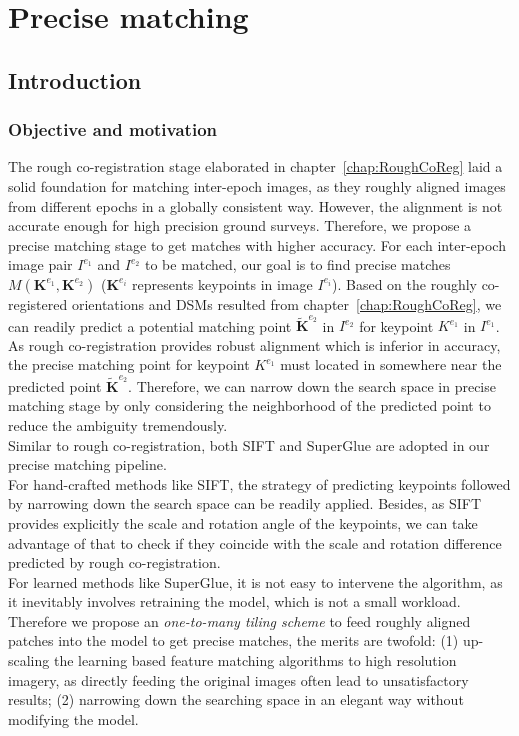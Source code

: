 
\chapter{Precise matching}
\label{chap:Precisematching}
\minitoc

\section{Introduction}
\subsection{Objective and motivation}
The rough co-registration stage elaborated in chapter~\ref{chap:RoughCoReg} laid a solid foundation for matching inter-epoch images, as they roughly aligned images from different epochs in a globally consistent way. However, the alignment is not accurate enough for high precision ground surveys. Therefore, we propose a precise matching stage to get matches with higher accuracy. 
For each inter-epoch image pair $I^{e_1}$ and $I^{e_2}$ to be matched, our goal is to find precise matches $M({\mathbf{K}^{e_1},\mathbf{K}^{e_2}})$ ($\mathbf{K}^{e_i}$ represents keypoints in image $I^{e_i}$). 
Based on the roughly co-registered orientations and \ac{DSM}s resulted from chapter~\ref{chap:RoughCoReg}, 
we can readily predict a potential matching point $\widetilde{\mathbf{K}}^{e_2}$ in $I^{e_2}$ for keypoint ${K}^{e_1}$ in $I^{e_1}$. As rough co-registration provides robust alignment which is inferior in accuracy, the precise matching point for keypoint ${K}^{e_1}$ must located in somewhere near the predicted point $\widetilde{\mathbf{K}}^{e_2}$. Therefore, we can narrow down the search space in precise matching stage by only considering the neighborhood of the predicted point to reduce the ambiguity tremendously.\\
Similar to rough co-registration, both SIFT and SuperGlue are adopted in our precise matching pipeline.\\
For hand-crafted methods like SIFT, the strategy of predicting keypoints followed by narrowing down the search space can be readily applied. Besides, as SIFT provides explicitly the scale and rotation angle of the keypoints, we can take advantage of that to check if they coincide with the scale and rotation difference predicted by rough co-registration.\\
For learned methods like SuperGlue, it is not easy to intervene the algorithm, as it inevitably involves retraining the model, which is not a small workload. Therefore we propose an \textit{one-to-many tiling scheme} to feed roughly aligned patches into the model to get precise matches, the merits are twofold: (1) up-scaling the learning based feature matching algorithms to high resolution imagery, as directly feeding the original images often lead to unsatisfactory results; (2) narrowing down the searching space in an elegant way without modifying the model.
